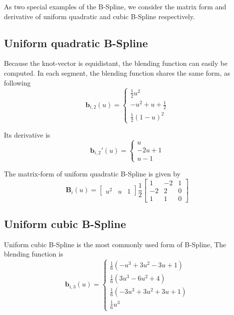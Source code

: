 As two special examples of the B-Spline, we consider the matrix form and
derivative of uniform quadratic and cubic B-Spline respectively.

\subsection{Uniform quadratic B-Spline}
\label{sec:uqb}

Because the knot-vector is equidistant, the blending function can
easily be computed. In each segment, the blending function shares the
same form, as following
\begin{equation}
  \label{eq:4.3}
  \mathbf{b}_{i,2}(u) = \begin{cases} \frac{1}{2}u^2 \\ -u^2 + u + \frac{1}{2} \\ \frac{1}{2}(1-u)^2   \end{cases}
\end{equation}

Its derivative is 
\begin{equation}
  \label{eq:4.4}
  \mathbf{b}_{i,2}'(u) = \begin{cases} u \\ -2u + 1 \\ u-1   \end{cases}
\end{equation}

The matrix-form of uniform quadratic B-Spline is given by
\begin{equation}
  \label{eq:4.5}
\mathbf{B}_i(u) = \begin{bmatrix} u^2 & u & 1 \end{bmatrix} \frac{1}{2} \begin{bmatrix}
1 & -2 & 1 \\
-2 &  2 & 0 \\
1 &  1 & 0 \end{bmatrix}
\end{equation}

\subsection{Uniform cubic B-Spline}
\label{sec:uqb}
Uniform cubic B-Spline is the most commonly used form of B-Spline, 
The blending function is
\begin{equation}
  \label{eq:4.6}
  \mathbf{b}_{i,3}(u) = \begin{cases} \frac{1}{6}(-u^3+3u^2-3u+1) \\
    \frac{1}{6}(3u^3 -6u^2+4)\\ \frac{1}{6}(-3u^3+3u^2+3u+1) \\
    \frac{1}{6}u^3
   \end{cases}
\end{equation}

